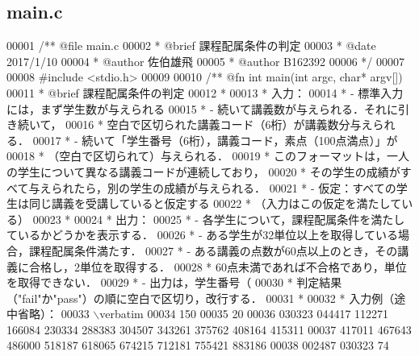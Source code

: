 \subsection{main.\-c}

\begin{DoxyCode}
00001 \textcolor{comment}{/**  @file main.c}
00002 \textcolor{comment}{ *   @brief  課程配属条件の判定}
00003 \textcolor{comment}{ *   @date   2017/1/10}
00004 \textcolor{comment}{ *   @author 佐伯雄飛}
00005 \textcolor{comment}{ *   @author B162392}
00006 \textcolor{comment}{ */}
00007 
00008 \textcolor{preprocessor}{#include <stdio.h>}
00009 \textcolor{comment}{}
00010 \textcolor{comment}{/** @fn int main(int argc, char* argv[])}
00011 \textcolor{comment}{ *  @brief 課程配属条件の判定}
00012 \textcolor{comment}{ *}
00013 \textcolor{comment}{ *  入力：}
00014 \textcolor{comment}{ *  - 標準入力には，まず学生数が与えられる}
00015 \textcolor{comment}{ *  - 続いて講義数が与えられる．それに引き続いて，}
00016 \textcolor{comment}{ *    空白で区切られた講義コード（6桁）が講義数分与えられる．}
00017 \textcolor{comment}{ *  - 続いて「学生番号（6桁），講義コード，素点（100点満点）」が}
00018 \textcolor{comment}{ *    （空白で区切られて）与えられる．}
00019 \textcolor{comment}{ *    このフォーマットは，一人の学生について異なる講義コードが連続しており，}
00020 \textcolor{comment}{ *    その学生の成績がすべて与えられたら，別の学生の成績が与えられる．}
00021 \textcolor{comment}{ *  - 仮定：すべての学生は同じ講義を受講していると仮定する}
00022 \textcolor{comment}{ *    （入力はこの仮定を満たしている）}
00023 \textcolor{comment}{ *}
00024 \textcolor{comment}{ *  出力：}
00025 \textcolor{comment}{ *  - 各学生について，課程配属条件を満たしているかどうかを表示する．}
00026 \textcolor{comment}{ *  - ある学生が32単位以上を取得している場合，課程配属条件満たす．}
00027 \textcolor{comment}{ *  - ある講義の点数が60点以上のとき，その講義に合格し，2単位を取得する．}
00028 \textcolor{comment}{ *    60点未満であれば不合格であり，単位を取得できない．}
00029 \textcolor{comment}{ *  - 出力は，学生番号（%
00030 \textcolor{comment}{ *    判定結果（"fail"か"pass"）の順に空白で区切り，改行する．}
00031 \textcolor{comment}{ *}
00032 \textcolor{comment}{ *  入力例（途中省略）：}
00033 \textcolor{comment}{\(\backslash\)verbatim}
00034 \textcolor{comment}{150}
00035 \textcolor{comment}{20}
00036 \textcolor{comment}{030323 044417 112271 166084 230334 288383 304507 343261 375762 408164 415311}
00037 \textcolor{comment}{417011 467643 486000 518187 618065 674215 712181 755421 883186}
00038 \textcolor{comment}{002487 030323 74}
}
\end{DoxyCode}
